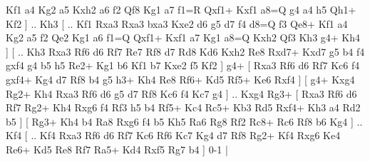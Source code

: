 Kf1  a4 Kg2  a5 Kxh2  a6 f2  Qf8 Kg1  a7 f1=R  Qxf1+ Kxf1  a8=Q g4  a4 h5  Qh1+ Kf2   ] .. Kh3 [ .. Kf1  Rxa3 Rxa3  bxa3 Kxe2  d6 g5  d7 f4  d8=Q f3  Qe8+ Kf1  a4 Kg2  a5 f2  Qe2 Kg1  a6 f1=Q  Qxf1+ Kxf1  a7 Kg1  a8=Q Kxh2  Qf3 Kh3  g4+ Kh4   ]  [ .. Kh3  Rxa3 Rf6  d6 Rf7  Re7 Rf8  d7 Rd8  Kd6 Kxh2  Re8 Rxd7+  Kxd7 g5  b4 f4  gxf4 g4  b5 h5  Re2+ Kg1  b6 Kf1  b7 Kxe2  f5 Kf2   ]  g4+ [  Rxa3 Rf6  d6 Rf7  Kc6 f4  gxf4+ Kg4  d7 Rf8  b4 g5  h3+ Kh4  Re8 Rf6+  Kd5 Rf5+  Ke6 Rxf4   ]  [  g4+ Kxg4  Rg2+ Kh4  Rxa3 Rf6  d6 g5  d7 Rf8  Kc6 f4  Kc7 g4   ] .. Kxg4    Rg3+ [  Rxa3 Rf6  d6 Rf7  Rg2+ Kh4  Rxg6 f4  Rf3 h5  b4 Rf5+  Kc4 Rc5+  Kb3 Rd5  Rxf4+ Kh3  a4 Rd2  b5   ]  [  Rg3+ Kh4  b4 Ra8  Rxg6 f4  b5 Kh5  Ra6 Rg8  Rf2 Rc8+  Rc6 Rf8  b6 Kg4   ] .. Kf4    [ .. Kf4  Rxa3 Rf6  d6 Rf7  Kc6 Rf6  Kc7 Kg4  d7 Rf8  Rg2+ Kf4  Rxg6 Ke4  Re6+ Kd5  Re8 Rf7  Ra5+ Kd4  Rxf5 Rg7  b4   ] 0-1  |

